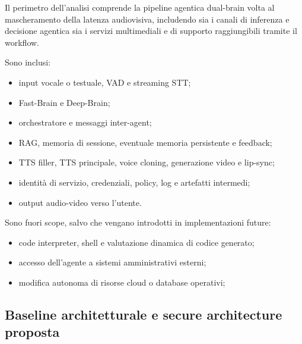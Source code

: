 \documentclass[11pt,a4paper]{article}
\begin{document}
Il perimetro dell'analisi comprende la pipeline agentica dual-brain volta al mascheramento della latenza audiovisiva, includendo sia i canali di inferenza e decisione agentica sia i servizi multimediali e di supporto raggiungibili tramite il workflow.

Sono inclusi:

\begin{itemize}
  \item input vocale o testuale, VAD e streaming STT;
  \item Fast-Brain e Deep-Brain;
  \item orchestratore e messaggi inter-agent;
  \item RAG, memoria di sessione, eventuale memoria persistente e feedback;
  \item TTS filler, TTS principale, voice cloning, generazione video e lip-sync;
  \item identità di servizio, credenziali, policy, log e artefatti intermedi;
  \item output audio-video verso l'utente.
\end{itemize}

Sono fuori scope, salvo che vengano introdotti in implementazioni future:

\begin{itemize}
  \item code interpreter, shell e valutazione dinamica di codice generato;
  \item accesso dell'agente a sistemi amministrativi esterni;
  \item modifica autonoma di risorse cloud o database operativi;
\end{itemize}

\subsection{Baseline architetturale e secure architecture proposta}
\label{subsec:baseline-secure}
\end{document}
